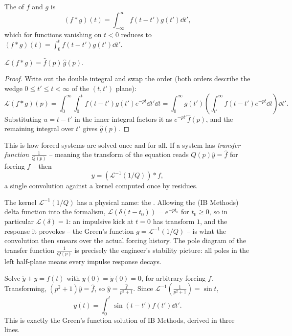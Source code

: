 \documentclass[a4paper]{scrartcl}
\begin{document}
\begin{definition}[Convolution]
	The  of $f$ and $g$ is
	$$
	(f * g)(t) = \int_{-\infty}^\infty f(t - t') g(t') \dd t',
	$$
	which for functions vanishing on $t < 0$ reduces to $\displaystyle (f*g)(t) = \int_0^t f(t - t')g(t') \dd t'$.
\end{definition}

\begin{theorem}
	$\mathcal L(f * g) = \hat f(p)\, \hat g(p)$.
\end{theorem}
\begin{proof}
	Write out the double integral and swap the order (both orders describe the wedge $0 \leq t' \leq t < \infty$ of the $(t, t')$ plane):
	$$
	\mathcal L(f * g)(p) = \int_0^\infty \int_0^t f(t - t')g(t') e^{-pt}\dd t' \dd t = \int_0^\infty g(t') \left(\int_{t'}^\infty f(t - t') e^{-pt} \dd t\right) \dd t'.
	$$
	Substituting $u = t - t'$ in the inner integral factors it as $e^{-pt'} \hat f(p)$, and the remaining integral over $t'$ gives $\hat g(p)$.
\end{proof}

This is how forced systems are solved once and for all. If a system has \emph{transfer function} $\frac{1}{Q(p)}$ -- meaning the transform of the equation reads $Q(p) \hat y = \hat f$ for forcing $f$ -- then
$$
y = (\mathcal{L}^{-1}(1/Q)) * f,
$$
a single convolution against a kernel computed once by residues.

\begin{remark}
	The kernel $\mathcal{L}^{-1}(1/Q)$ has a physical name: the . Allowing the (IB Methods) delta function into the formalism, $\mathcal L(\delta(t - t_0)) = e^{-p t_0}$ for $t_0 \geq 0$, so in particular $\mathcal L(\delta) = 1$: an impulsive kick at $t = 0$ has transform $1$, and the response it provokes -- the Green's function $g = \mathcal{L}^{-1}(1/Q)$ -- is what the convolution then smears over the actual forcing history. The pole diagram of the transfer function $\frac{1}{Q(p)}$ is precisely the engineer's stability picture: all poles in the left half-plane means every impulse response decays.
\end{remark}

\begin{example}
	Solve $\ddot y + y = f(t)$ with $y(0) = \dot y(0) = 0$, for arbitrary forcing $f$. Transforming, $(p^2 + 1)\hat y = \hat f$, so $\hat y = \frac{\hat f}{p^2 + 1}$. Since $\mathcal{L}^{-1}\left(\frac{1}{p^2+1}\right) = \sin t$,
	$$
	y(t) = \int_0^t \sin(t - t') f(t') \dd t'.
	$$
	This is exactly the Green's function solution of IB Methods, derived in three lines.
\end{example}
\end{document}
